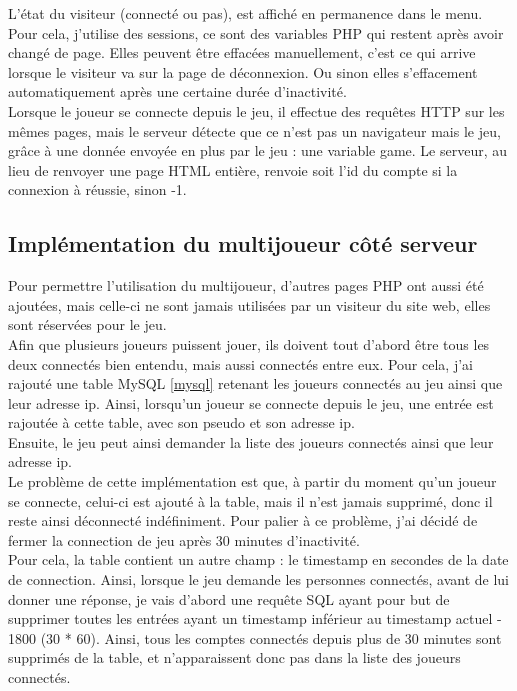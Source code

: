\documentclass[12pt]{article}
\begin{document}
L'état du visiteur (connecté ou pas), est affiché en permanence dans le menu. Pour cela, j'utilise des sessions, ce sont des variables PHP qui restent après avoir changé de page. Elles peuvent être effacées manuellement, c'est ce qui arrive lorsque le visiteur va sur la page de déconnexion. Ou sinon elles s'effacement automatiquement après une certaine durée d'inactivité.\\

Lorsque le joueur se connecte depuis le jeu, il effectue des requêtes \gls{HTTP} sur les mêmes pages, mais le serveur détecte que ce n'est pas un navigateur mais le jeu, grâce à une donnée envoyée en plus par le jeu : une variable game. Le serveur, au lieu de renvoyer une page HTML entière, renvoie soit l'id du compte si la connexion à réussie, sinon -1.

\subsection{Implémentation du multijoueur côté serveur}

Pour permettre l'utilisation du multijoueur, d'autres pages PHP ont aussi été ajoutées, mais celle-ci ne sont jamais utilisées par un visiteur du site web, elles sont réservées pour le jeu.\\
Afin que plusieurs joueurs puissent jouer,  ils doivent tout d'abord être tous les deux connectés bien entendu, mais aussi connectés entre eux. Pour cela, j'ai rajouté une table MySQL \ref{mysql} retenant les joueurs connectés au jeu ainsi que leur adresse ip. Ainsi, lorsqu'un joueur se connecte depuis le jeu, une entrée est rajoutée à cette table, avec son pseudo et son adresse ip.\\

Ensuite, le jeu peut ainsi demander la liste des joueurs connectés ainsi que leur adresse ip.\\
Le problème de cette implémentation est que, à partir du moment qu'un joueur se connecte, celui-ci est ajouté à la table, mais il n'est jamais supprimé, donc il reste ainsi déconnecté indéfiniment. Pour palier à ce problème, j'ai décidé de fermer la connection de jeu après 30 minutes d'inactivité.\\
Pour cela, la table contient un autre champ : le \gls{timestamp} en secondes de la date de connection. Ainsi, lorsque le jeu demande les personnes connectés, avant de lui donner une réponse, je vais d'abord une requête SQL ayant pour but de supprimer toutes les entrées ayant un timestamp inférieur au timestamp actuel - 1800 (30 * 60). Ainsi, tous les comptes connectés depuis plus de 30 minutes sont supprimés de la table, et n'apparaissent donc pas dans la liste des joueurs connectés.
\end{document}
